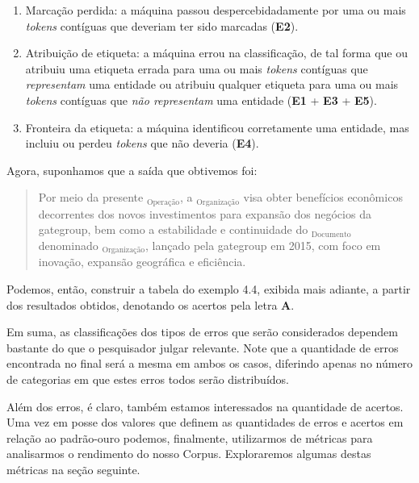 \documentclass[11pt]{report}
\begin{document}
\begin{enumerate}[label=\textbf{e\arabic*.}]
  \item Marcação perdida: a máquina passou despercebidadamente por uma ou mais \textit{tokens} contíguas que deveriam ter sido marcadas (\textbf{E2}).
  \item Atribuição de etiqueta: a máquina errou na classificação, de tal forma que ou atribuiu uma etiqueta errada  para uma ou mais \textit{tokens}
  contíguas que \textit{representam} uma entidade ou atribuiu qualquer etiqueta para uma ou mais \textit{tokens} contíguas que \textit{não representam} uma entidade
  (\textbf{E1} + \textbf{E3} + \textbf{E5}).
  \item Fronteira da etiqueta: a máquina identificou corretamente uma entidade, mas incluiu ou perdeu \textit{tokens} que não deveria (\textbf{E4}).
\end{enumerate}

Agora, suponhamos que a saída que obtivemos foi:

\begin{quote}
  \begin{varwidth}{0.89\textwidth}
  Por meio da presente $_{\text{Operação}}$, a $_{\text{Organização}}$ visa obter benefícios econômicos decorrentes dos novos investimentos
  para expansão dos negócios da gategroup,
  bem como a  estabilidade e  continuidade do $_{\text{Documento}}$ denominado $_{\text{Organização}}$, lançado pela gategroup
  em 2015, com foco em inovação, expansão geográfica e eficiência.
  \end{varwidth}
\end{quote}

Podemos, então, construir a tabela do exemplo 4.4, exibida mais adiante, a partir dos resultados obtidos, denotando os acertos pela letra \textbf{A}.

Em suma, as classificações dos tipos de erros que
serão considerados dependem bastante do que o pesquisador julgar relevante. Note que a quantidade de erros encontrada no final será a mesma em ambos os casos,
diferindo apenas no número de categorias em que estes erros todos serão distribuídos.

Além dos erros, é claro, também estamos interessados na quantidade de acertos. Uma vez em posse dos valores que definem as quantidades de erros e acertos em relação
ao padrão-ouro podemos, finalmente, utilizarmos de métricas para analisarmos o rendimento do nosso Corpus. Exploraremos algumas destas métricas na seção seguinte.
\end{document}
